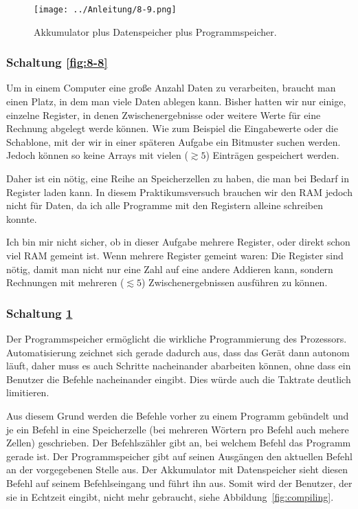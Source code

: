 \begin{figure}[htbp]
	\centering
	\texttt{[image: ../Anleitung/8-9.png]}
	\caption{%
		Akkumulator plus Datenspeicher plus Programmspeicher.
		\cite[Abbildung~8.9]{physik313-Anleitung}
	}
	\label{fig:8-9}
\end{figure}

\subsubsection{Schaltung \ref{fig:8-8}}

Um in einem Computer eine große Anzahl Daten zu verarbeiten, braucht man einen
Platz, in dem man viele Daten ablegen kann. Bisher hatten wir nur einige,
einzelne Register, in denen Zwischenergebnisse oder weitere Werte für eine
Rechnung abgelegt werde können. Wie zum Beispiel die Eingabewerte oder die
Schablone, mit der wir in einer späteren Aufgabe ein Bitmuster suchen werden.
Jedoch können so keine Arrays mit vielen ($\gtrsim 5$) Einträgen gespeichert
werden.

Daher ist ein nötig, eine Reihe an Speicherzellen zu haben, die man bei Bedarf
in Register laden kann. In diesem Praktikumsversuch brauchen wir den RAM jedoch
nicht für Daten, da ich alle Programme mit den Registern alleine schreiben
konnte.

Ich bin mir nicht sicher, ob in dieser Aufgabe mehrere Register, oder direkt
schon viel RAM gemeint ist. Wenn mehrere Register gemeint waren: Die Register
sind nötig, damit man nicht nur eine Zahl auf eine andere Addieren kann,
sondern Rechnungen mit mehreren ($\lesssim 5$) Zwischenergebnissen ausführen zu
können.

\subsubsection{Schaltung \ref{fig:8-9}}

Der Programmspeicher ermöglicht die wirkliche Programmierung des Prozessors.
Automatisierung zeichnet sich gerade dadurch aus, dass das Gerät dann autonom
läuft, daher muss es auch Schritte nacheinander abarbeiten können, ohne dass
ein Benutzer die Befehle nacheinander eingibt. Dies würde auch die Taktrate
deutlich limitieren.

Aus diesem Grund werden die Befehle vorher zu einem Programm gebündelt und je
ein Befehl in eine Speicherzelle (bei mehreren Wörtern pro Befehl auch mehere
Zellen) geschrieben. Der Befehlszähler gibt an, bei welchem Befehl das Programm
gerade ist. Der Programmspeicher gibt auf seinen Ausgängen den aktuellen Befehl
an der vorgegebenen Stelle aus. Der Akkumulator mit Datenspeicher sieht diesen
Befehl auf seinem Befehlseingang und führt ihn aus. Somit wird der Benutzer,
der sie in Echtzeit eingibt, nicht mehr gebraucht, siehe
Abbildung~\ref{fig:compiling}.

